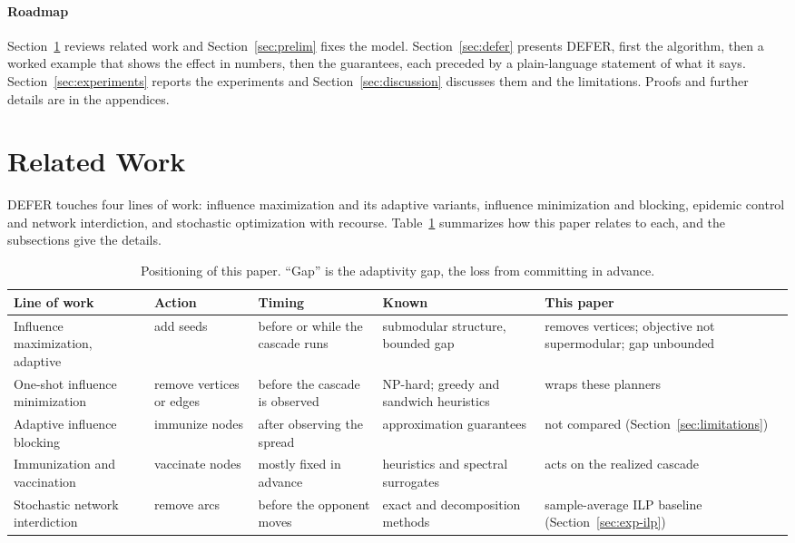 \documentclass[preprint,11pt]{elsarticle}
\theoremstyle{definition}
\theoremstyle{remark}
\newcommand{\up}{\rule{0pt}{2.6ex}}
\begin{document}
\paragraph{Roadmap} Section~\ref{sec:related} reviews related work and Section~\ref{sec:prelim} fixes the model. Section~\ref{sec:defer} presents DEFER, first the algorithm, then a worked example that shows the effect in numbers, then the guarantees, each preceded by a plain-language statement of what it says. Section~\ref{sec:experiments} reports the experiments and Section~\ref{sec:discussion} discusses them and the limitations. Proofs and further details are in the appendices.

\section{Related Work}\label{sec:related}

DEFER touches four lines of work: influence maximization and its adaptive variants, influence minimization and blocking, epidemic control and network interdiction, and stochastic optimization with recourse. Table~\ref{tab:related} summarizes how this paper relates to each, and the subsections give the details.

\begin{table}[h]
\centering
\caption{Positioning of this paper. ``Gap'' is the adaptivity gap, the loss from committing in advance.}\label{tab:related}
\small
\begin{tabular}{@{}>{\raggedright\arraybackslash}p{}>{\raggedright\arraybackslash}p{}>{\raggedright\arraybackslash}p{}>{\raggedright\arraybackslash}p{}>{\raggedright\arraybackslash}p{}@{}}
\hline
\up Line of work & Action & Timing & Known & This paper \\
\hline
\up Influence maximization, adaptive & add seeds & before or while the cascade runs & submodular structure, bounded gap & removes vertices; objective not supermodular; gap unbounded \\
One-shot influence minimization & remove vertices or edges & before the cascade is observed & NP-hard; greedy and sandwich heuristics & wraps these planners \\
Adaptive influence blocking & immunize nodes & after observing the spread & approximation guarantees \citep{shi2019} & not compared (Section~\ref{sec:limitations}) \\
Immunization and vaccination & vaccinate nodes & mostly fixed in advance & heuristics and spectral surrogates & acts on the realized cascade \\
Stochastic network interdiction & remove arcs & before the opponent moves & exact and decomposition methods & sample-average ILP baseline (Section~\ref{sec:exp-ilp}) \\
\hline
\end{tabular}
\end{table}
\end{document}
